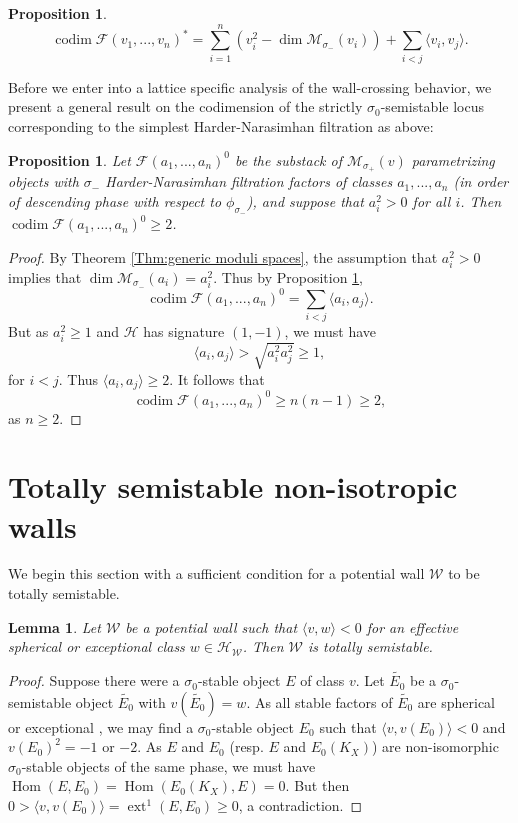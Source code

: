 \documentclass[leqno,11pt]{amsart}
\def\codim{\mathop{\mathrm{codim}}\nolimits}
\def\dim{\mathop{\mathrm{dim}}\nolimits}
\def\ext{\mathop{\mathrm{ext}}\nolimits}
\def\Hom{\mathop{\mathrm{Hom}}\nolimits}
\newtheorem{Prop}[Thm]{Proposition}
\newtheorem{Lem}[Thm]{Lemma}
\theoremstyle{definition}
\def\FF{\ensuremath{\mathcal F}}
\def\HH{\ensuremath{\mathcal H}}
\def\MM{\ensuremath{\mathcal M}}
\def\WW{\ensuremath{\mathcal W}}
\begin{document}
\begin{Prop}\label{Prop:HN codim}
$$\codim\FF(v_1,...,v_n)^*
=\sum_{i=1}^n (v_i^2-\dim\MM_{\sigma_-}(v_i))+\sum_{i<j}\langle v_i,v_j\rangle.$$

\end{Prop}

Before we enter into a lattice specific analysis of the wall-crossing behavior, we present a general result on the codimension of the strictly $\sigma_0$-semistable locus corresponding to the simplest Harder-Narasimhan filtration as above:
\begin{Prop}\label{Prop:HN filtration all positive classes}
Let $\FF(a_1,...,a_n)^0$ be the substack of $\MM_{\sigma_+}(v)$ parametrizing objects with $\sigma_-$ Harder-Narasimhan filtration factors of classes $a_1,...,a_n$ (in order of descending phase with respect to $\phi_{\sigma_-}$), and suppose that $a_i^2>0$ for all $i$.  Then $\codim\FF(a_1,...,a_n)^0\geq 2$.  
\end{Prop}
\begin{proof}
By Theorem \ref{Thm:generic moduli spaces}, the assumption that $a_i^2>0$ implies that $\dim\MM_{\sigma_-}(a_i)=a_i^2$.  Thus by Proposition \ref{Prop:HN codim}, $$\codim\FF(a_1,...,a_n)^0=\sum_{i<j}\langle a_i,a_j\rangle.$$  But as $a_i^2\geq 1$ and $\HH$ has signature $(1,-1)$, we must have $$\langle a_i,a_j\rangle>\sqrt{a_i^2 a_j^2}\geq 1,$$ for $i<j$.  Thus $\langle a_i,a_j\rangle\geq 2$.  It follows that $$\codim\FF(a_1,...,a_n)^0\geq n(n-1)\geq 2,$$ as $n\geq 2$.
\end{proof}

\section{Totally semistable non-isotropic walls}
We begin this section with a sufficient condition for a potential wall $\WW$ to be totally semistable.  

\begin{Lem}\label{Lem: condition for totally semistable wall}
Let $\WW$ be a potential wall such that $\langle v,w\rangle<0$ for an effective spherical or exceptional class $w\in\HH_{\WW}$.  Then $\WW$ is totally semistable.
\end{Lem}

\begin{proof}
Suppose there were a $\sigma_0$-stable object $E$ of class $v$.  Let $\tilde{E_0}$ be a $\sigma_0$-semistable object $\tilde{E_0}$ with $v(\tilde{E_0})=w$.  As all stable factors of $\tilde{E_0}$ are spherical or exceptional \cite[Lemma 4.3, Lemma 4.6]{Yos16b}, we may find a $\sigma_0$-stable object $E_0$ such that $\langle v,v(E_0)\rangle<0$ and $v(E_0)^2=-1$ or $-2$.  As $E$ and $E_0$ (resp. $E$ and $E_0(K_X)$) are non-isomorphic $\sigma_0$-stable objects of the same phase, we must have $\Hom(E,E_0)=\Hom(E_0(K_X),E)=0$.  But then $0>\langle v,v(E_0)\rangle=\ext^1(E,E_0)\geq 0$, a contradiction.
\end{proof}
\end{document}

